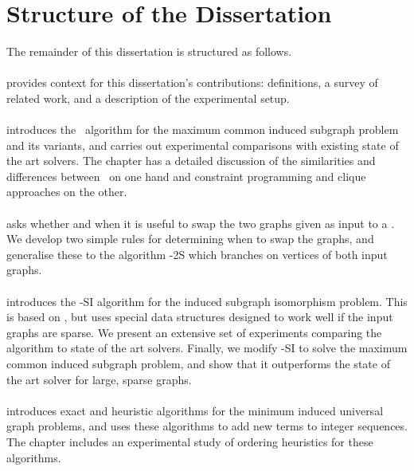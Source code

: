 \section{Structure of the Dissertation}

The remainder of this dissertation is structured as follows.

\paragraph*{} provides context for this dissertation's
contributions: definitions, a survey of related work, and a description of the
experimental setup.

\paragraph*{} introduces the \McSplit\
algorithm for the maximum common induced subgraph problem and its variants, and
carries out experimental comparisons with existing state of the art solvers.
The chapter has a detailed discussion of the similarities and differences
between \McSplit\ on one hand and constraint programming and clique approaches
on the other.


\paragraph*{} asks whether and when
it is useful to swap the two graphs given as input to a \McSplit.  We develop
two simple rules for determining when to swap the graphs, and generalise
these to the algorithm \McSplit-2S which branches on vertices of both
input graphs.

\paragraph*{} introduces the \McSplit-SI algorithm for the
induced subgraph isomorphism problem.  This is based on \McSplit, but uses
special data structures designed to work well if the input graphs are sparse.
We present an extensive set of experiments comparing the algorithm to state of
the art solvers.  Finally, we modify \McSplit-SI to solve the maximum common
induced subgraph problem, and show that it outperforms the state of the art
solver for large, sparse graphs.

\paragraph*{} introduces exact and heuristic
algorithms for the minimum induced universal graph problems, and uses these
algorithms to add new terms to integer sequences.  The chapter includes
an experimental study of ordering heuristics for these algorithms.

